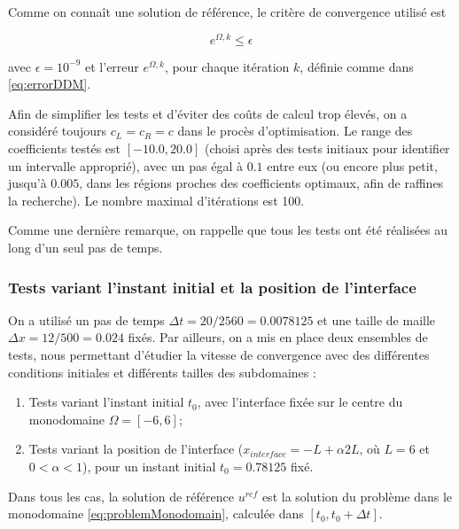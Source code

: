 \indent Comme on connaît une solution de référence, le critère de convergence utilisé est

\begin{equation*}
\label{eq:criteriaConvergence}
	e^{\Omega,k} \leq \epsilon
\end{equation*}

\noindent avec $\epsilon = 10^{-9}$ et  l'erreur $e^{\Omega,k}$, pour chaque itération $k$, définie comme dans \eqref{eq:errorDDM}.

\indent Afin de simplifier les tests et d'éviter des coûts de calcul trop élevés,  on a considéré toujours $c_L = c_R = c$  dans le procès d'optimisation. Le range des coefficients testés est $[-10.0, 20.0]$ (choisi après des tests initiaux pour identifier un intervalle approprié), avec un pas égal à  $0.1$ entre eux (ou encore plus petit, jusqu'à $0.005$, dans les régions proches des coefficients optimaux, afin de raffines la recherche). Le nombre maximal d'itérations est 100.

\indent Comme une dernière remarque, on rappelle que tous les tests ont été réalisées au long d'un seul pas de temps.

\subsubsection{Tests variant l'instant initial et la position de l'interface}

\indent On a utilisé un pas de temps $\Delta t = 20/2560 = 0.0078125$ et une taille de maille $\Delta x = 12/500 = 0.024$ fixés. Par ailleurs, on a mis en place deux ensembles de tests, nous permettant d'étudier la vitesse de convergence avec des différentes conditions initiales et différents tailles des subdomaines :

\begin{enumerate}
	\item Tests variant l'instant initial $t_0$, avec l'interface fixée sur le centre du monodomaine $\Omega = [-6,6]$;
	\item Tests variant la position de l'interface ($x_{interface} = -L + \alpha 2L$, où  $L = 6$ et $0 < \alpha < 1$), pour un instant initial $t_0 = 0.78125$ fixé.
\end{enumerate}

\indent Dans tous les cas, la solution de référence $u^{ref}$ est la solution du problème dans le monodomaine \eqref{eq:problemMonodomain}, calculée dans $[t_0,t_0 + \Delta t]$.

